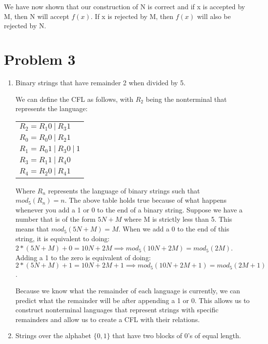 \documentclass[11pt, letterpaper]{article}
\begin{document}
We have now shown that our construction of N is correct and if x is accepted by M, then N will accept $f(x)$. If x is rejected by M, then $f(x)$ will also be rejected by N.

\pagebreak

\section*{Problem 3}

\begin{enumerate}[label=\Alph*]

\item Binary strings that have remainder 2 when divided by 5.

We can define the CFL as follows, with $R_2$ being the nonterminal that represents the language:

\begin{center}
\begin{tabular}{l}
$R_2 = R_1 0\ |\ R_3 1 $ \\
$R_0 = R_0 0\ |\ R_2 1 $ \\
$R_1 = R_0 1\ |\ R_3 0\ |\ 1 $ \\
$R_3 = R_1 1\ |\ R_4 0 $ \\
$R_4 = R_2 0\ |\ R_4 1 $ \\
\end{tabular}
\end{center}

\quad Where $R_n$ represents the language of binary strings such that $mod_5(R_n) = n$. The above table holds true because of what happens whenever you add a 1 or 0 to the end of a binary string. Suppose we have a number that is of the form $5N + M$ where M is strictly less than 5. This means that $mod_5(5N + M) = M$. When we add a 0 to the end of this string, it is equivalent to doing: $ 2 * (5N + M) + 0 = 10N + 2M \implies mod_5(10N + 2M) = mod_5(2M)$. Adding a 1 to the zero is equivalent of doing: $ 2 * (5N + M) + 1 = 10N + 2M + 1 \implies mod_5(10N + 2M + 1) = mod_5(2M+1)$. 

\quad Because we know what the remainder of each language is currently, we can predict what the remainder will be after appending a 1 or 0. This allows us to construct nonterminal languages that represent strings with specific remainders and allow  us to create a CFL with their relations.

\item Strings over the alphabet $\{0, 1\}$ that have two blocks of 0's of equal length.


\end{enumerate}
\end{document}
